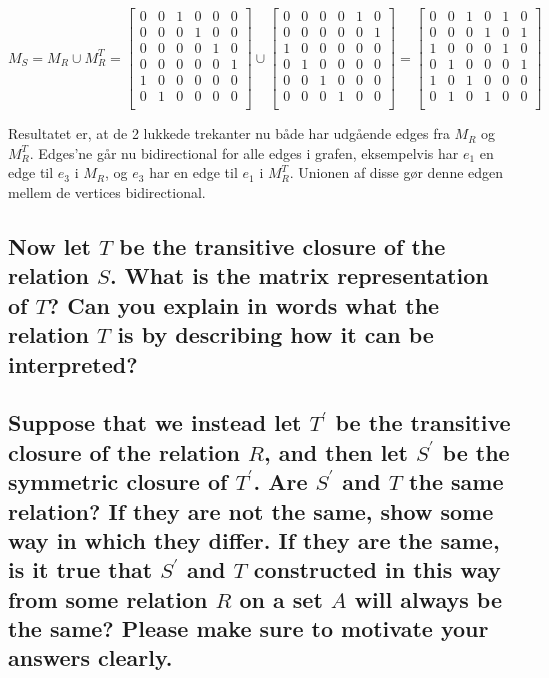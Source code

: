 \documentclass[a4paper,12pt]{article}
\begin{document}
\[M_S = M_R \cup M_{R}^T = 
    \begin{bmatrix}
        0 & 0 & 1 & 0 & 0 & 0 \\
        0 & 0 & 0 & 1 & 0 & 0 \\
        0 & 0 & 0 & 0 & 1 & 0 \\
        0 & 0 & 0 & 0 & 0 & 1 \\
        1 & 0 & 0 & 0 & 0 & 0 \\
        0 & 1 & 0 & 0 & 0 & 0 \\
    \end{bmatrix}
    \cup
    \begin{bmatrix}
        0 & 0 & 0 & 0 & 1 & 0 \\
        0 & 0 & 0 & 0 & 0 & 1 \\
        1 & 0 & 0 & 0 & 0 & 0 \\
        0 & 1 & 0 & 0 & 0 & 0 \\
        0 & 0 & 1 & 0 & 0 & 0 \\
        0 & 0 & 0 & 1 & 0 & 0 \\
    \end{bmatrix}
    = 
    \begin{bmatrix}
        0 & 0 & 1 & 0 & 1 & 0 \\
        0 & 0 & 0 & 1 & 0 & 1 \\
        1 & 0 & 0 & 0 & 1 & 0 \\
        0 & 1 & 0 & 0 & 0 & 1 \\
        1 & 0 & 1 & 0 & 0 & 0 \\
        0 & 1 & 0 & 1 & 0 & 0 \\
    \end{bmatrix}
\]

Resultatet er, at de 2 lukkede trekanter nu både har udgående edges fra $M_R$ og $M^T_{R}$. Edges'ne går nu bidirectional for alle edges i grafen, eksempelvis har $e_1$ en edge til $e_3$ i $M_R$, og $e_3$ har en edge til $e_1$ i $M^T_{R}$. Unionen af disse gør denne edgen mellem de vertices bidirectional.

\subsection[]{Now let $T$ be the transitive closure of the relation $S$. What is the matrix representation of $T$? 
Can you explain in words what the relation $T$ is by describing how it can be interpreted?
}



\subsection[]{Suppose that we instead let $T^\prime$ be the transitive closure of the relation $R$, and then let
$S^\prime$ be the symmetric closure of $T^\prime$. Are $S^\prime$ and $T$ the same relation? If they are not the
same, show some way in which they differ. If they are the same, is it true that $S^\prime$ and $T$
constructed in this way from some relation $R$ on a set $A$ will always be the same? Please
make sure to motivate your answers clearly.
}
\end{document}
